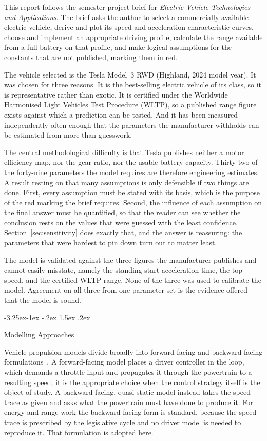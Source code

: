 \documentclass[twocolumn]{article}
\makeatletter
\renewcommand\subsection{\@startsection{subsection}{2}{\z@}%
  {-3.25ex\@plus -1ex \@minus -.2ex}%
  {1.5ex \@plus .2ex}%
  {\raggedright\normalfont\large\bfseries}}
\makeatother
\begin{document}
This report follows the semester project brief for \emph{Electric Vehicle
Technologies and Applications}. The brief asks the author to select a
commercially available electric vehicle, derive and plot its speed and
acceleration characteristic curves, choose and implement an appropriate driving
profile, calculate the range available from a full battery on that profile, and
make logical assumptions for the constants that are not published, marking them
in red.

The vehicle selected is the Tesla Model~3 RWD (Highland, 2024 model year). It
was chosen for three reasons. It is the best-selling electric vehicle of its
class, so it is representative rather than exotic. It is certified under the
Worldwide Harmonised Light Vehicles Test Procedure (WLTP), so a published range
figure exists against which a prediction can be tested. And it has been
measured independently often enough that the parameters the manufacturer
withholds can be estimated from more than guesswork.

The central methodological difficulty is that Tesla publishes neither a motor
efficiency map, nor the gear ratio, nor the usable battery capacity. Thirty-two
of the forty-nine parameters the model requires are therefore engineering
estimates. A result resting on that many assumptions is only defensible if two
things are done. First, every assumption must be stated with its basis, which
is the purpose of the red marking the brief requires. Second, the influence of
each assumption on the final answer must be quantified, so that the reader can
see whether the conclusion rests on the values that were guessed with the least
confidence. Section~\ref{sec:sensitivity} does exactly that, and the answer is
reassuring: the parameters that were hardest to pin down turn out to matter
least.

The model is validated against the three figures the manufacturer publishes and
cannot easily misstate, namely the standing-start acceleration time, the top
speed, and the certified WLTP range. None of the three was used to calibrate
the model. Agreement on all three from one parameter set is the evidence
offered that the model is sound.

\subsection{Modelling Approaches}

Vehicle propulsion models divide broadly into forward-facing and
backward-facing formulations~\cite{guzzella2013}. A forward-facing model places
a driver controller in the loop, which demands a throttle input and propagates
it through the powertrain to a resulting speed; it is the appropriate choice
when the control strategy itself is the object of study. A backward-facing,
quasi-static model instead takes the speed trace as given and asks what the
powertrain must have done to produce it. For energy and range work the
backward-facing form is standard, because the speed trace is prescribed by the
legislative cycle and no driver model is needed to reproduce it. That
formulation is adopted here.
\end{document}
